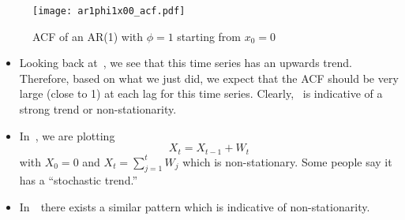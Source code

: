 \begin{figure}[!htbp]
    \centering
    \texttt{[image: ar1phi1x00\_acf.pdf]}
    \caption{ACF of an AR(1) with $ \phi=1 $ starting from
        $ x_0=0 $}\label{fig:ar1phi1x00_acf}
\end{figure}
\begin{itemize}
    \item Looking back at~, we see that this time series has an
          upwards trend. Therefore, based on what we just did, we expect
          that the ACF should be very large (close to 1) at each lag
          for this time series. Clearly,~ is indicative
          of a strong trend or non-stationarity.
    \item In~, we are plotting
          \[ X_t=X_{t-1}+W_{t} \]
          with $ X_0=0 $ and $ X_t=\sum_{j=1}^{t} W_j $ which is
          non-stationary. Some people say it has a ``stochastic trend.''
    \item In~~there exists a
          similar pattern which is indicative of non-stationarity.
\end{itemize}
